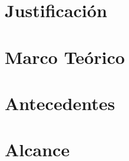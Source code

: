 \documentclass[10pt, letterpaper]{report}
\newcommand{\defaultparformat}[1]{
	{\setlength{\parskip}{2ex}
    }
}
\begin{document}

\newpage
\thispagestyle{empty}
\mbox{}
\newpage  

\ifdefined\CAPjustificacion
	\newpage
	\chapter{Justificación}
	\ifdefined\parpordefecto
		\defaultparformat{justificacion}
	\else
		
	\fi
\fi


\newpage
\thispagestyle{empty}
\mbox{}
\newpage  

\ifdefined\CAPmarcoteorico
	\newpage
	\chapter{Marco Teórico}
	\ifdefined\parpordefecto
		\defaultparformat{marco_teorico}
	\else
		
	\fi
\fi


\newpage
\thispagestyle{empty}
\mbox{}
\newpage  

\ifdefined\CAPantecedentes
	\newpage
	\chapter{Antecedentes}
	\ifdefined\parpordefecto
    	\defaultparformat{antecedentes}
    \else
    	
    \fi  
\fi


\newpage
\thispagestyle{empty}
\mbox{}
\newpage  

\ifdefined\CAPalcance
	\newpage
	\chapter{Alcance}
	\ifdefined\parpordefecto
    	\defaultparformat{alcance}
    \else
    	
    \fi 
\fi


\newpage
\thispagestyle{empty}
\mbox{}
\newpage  
\end{document}
